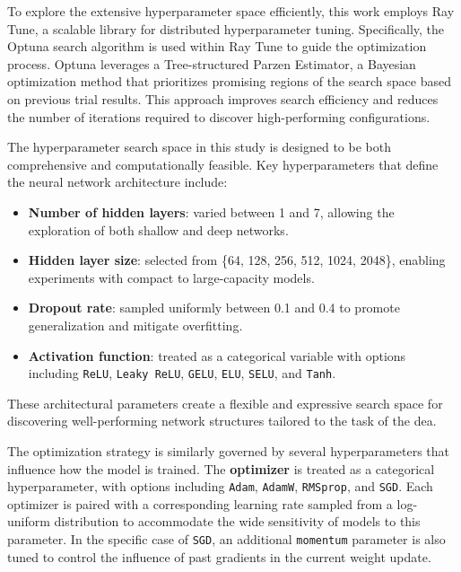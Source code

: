 To explore the extensive hyperparameter space efficiently, this work employs Ray Tune, a scalable library for distributed hyperparameter tuning.
Specifically, the Optuna search algorithm is used within Ray Tune to guide the optimization process.
Optuna leverages a Tree-structured Parzen Estimator, a Bayesian optimization method that prioritizes promising regions of the search space based on previous trial results.
This approach improves search efficiency and reduces the number of iterations required to discover high-performing configurations.

The hyperparameter search space in this study is designed to be both comprehensive and computationally feasible.
Key hyperparameters that define the neural network architecture include:

\begin{itemize}
    \item \textbf{Number of hidden layers}: varied between 1 and 7, allowing the exploration of both shallow and deep networks.
    \item \textbf{Hidden layer size}: selected from \{64, 128, 256, 512, 1024, 2048\}, enabling experiments with compact to large-capacity models.
    \item \textbf{Dropout rate}: sampled uniformly between 0.1 and 0.4 to promote generalization and mitigate overfitting.
    \item \textbf{Activation function}: treated as a categorical variable with options including \texttt{ReLU}, \texttt{Leaky ReLU}, \texttt{GELU}, \texttt{ELU}, \texttt{SELU}, and \texttt{Tanh}.
\end{itemize}

These architectural parameters create a flexible and expressive search space for discovering well-performing network structures tailored to the task of the \ac{dea}.

The optimization strategy is similarly governed by several hyperparameters that influence how the model is trained.
The \textbf{optimizer} is treated as a categorical hyperparameter, with options including \texttt{Adam}, \texttt{AdamW}, \texttt{RMSprop}, and \texttt{SGD}.
Each optimizer is paired with a corresponding learning rate sampled from a log-uniform distribution to accommodate the wide sensitivity of models to this parameter.
In the specific case of \texttt{SGD}, an additional \texttt{momentum} parameter is also tuned to control the influence of past gradients in the current weight update.

